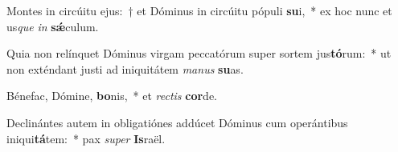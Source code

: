 \item Montes in circúitu ejus:~† et Dóminus in circúitu pópuli \textbf{su}i,~* ex hoc nunc et us\textit{que} \textit{in} \textbf{sǽ}culum.
\item Quia non relínquet Dóminus virgam peccatórum super sortem jus\textbf{tó}rum:~* ut non exténdant justi ad iniquitátem \textit{ma}\textit{nus} \textbf{su}as.
\item Bénefac, Dómine, \textbf{bo}nis,~* et \textit{rec}\textit{tis} \textbf{cor}de.
\item Declinántes autem in obligatiónes addúcet Dóminus cum operántibus iniqui\textbf{tá}tem:~* pax \textit{su}\textit{per} \textbf{Is}raël.
